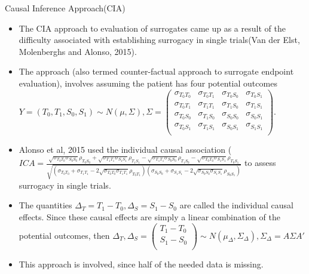 \documentclass[a4paper,9pt]{beamer}\usepackage[]{graphicx}\usepackage[]{color}
\begin{document}
\begin{frame}{Causal Inference Approach(CIA)}
\begin{itemize}
\item The CIA approach to evaluation of surrogates came up as a result of the difficulty associated with establishing surrogacy in single trials(Van der Elst, Molenberghs and Alonso, 2015).
\item The approach (also termed counter-factual approach to surrogate endpoint evaluation), involves assuming the patient has four potential outcomes$Y = (T_0, T_1, S_0, S_1) \sim N(\mu,  \Sigma ), \Sigma = \left( \begin{array}{cc|cc}
\sigma_{T_0T_0} & \sigma_{T_0T_1} & \sigma_{T_0S_0} & \sigma_{T_0S_1}\\
\sigma_{T_0T_1} & \sigma_{T_1T_1} & \sigma_{T_1S_0} & \sigma_{T_1S_1}\\
\hline
\sigma_{T_0S_0} & \sigma_{T_1S_0} & \sigma_{S_0S_0} & \sigma_{S_0S_1}\\
\sigma_{T_0S_1} & \sigma_{T_1S_1} & \sigma_{S_0S_1} & \sigma_{S_1S_1}\\
\end{array}\right)$. 
\item Alonso et al, 2015 used the individual causal association ($ICA = \frac{\sqrt{\sigma_{T_0T_0}\sigma_{S_0S_0}}\rho_{T_0S_0} + 
\sqrt{\sigma_{T_1T_1}\sigma_{S_1S_1}}\rho_{T_1S_1} - 
\sqrt{\sigma_{T_1T_1}\sigma_{S_0S_0}}\rho_{T_1S_0}  - 
\sqrt{\sigma_{T_0T_0}\sigma_{S_1S_1}}\rho_{T_0S_1} }{\sqrt{(\sigma_{T_0T_0} + \sigma_{T_1T_1} - 
2\sqrt{\sigma_{T_0T_0}\sigma_{T_1T_1}}\rho_{T_0T_1} )(\sigma_{S_0S_0} +
\sigma_{S_1S_1} - 
2\sqrt{\sigma_{S_0S_0}\sigma_{S_1S_1}}\rho_{S_0S_1} )} }$ to assess surrogacy in single trials.
\item The quantities $\Delta_T = T_{1} - T_{0}, \Delta_S = S_{1} - S_{0}$ are called the individual causal effects. Since these causal effects are simply a linear combination of the potential outcomes, then $\Delta_T, \Delta_S = \left(
\begin{array}{c}
T_{1} - T_{0}\\
S_{1} - S_{0}\\
\end{array}
\right) \sim N(\mu_{\Delta}, \Sigma_\Delta), \Sigma_\Delta = A \Sigma A'$ 
\item This approach is involved, since half of the needed data is missing.
\end{itemize}

\end{frame}
\end{document}
